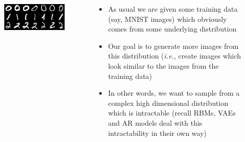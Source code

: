 \begin{frame}

	\begin{columns}

		\begin{center}
			\begin{figure}
				\includegraphics[scale=0.3]{images/mnist_ground.png}
			\end{figure}
		\end{center}
		
		\begin{overlayarea}{\textwidth}{\textheight}
			\begin{itemize}[<+->]
			\item As usual we are given some training data (say, MNIST images) which obviously comes from some underlying distribution
			\item Our goal is to generate more images from this distribution (\textit{i.e.}, create images which look similar to the images from the training data)
			\item In other words, we want to sample from a complex high dimensional distribution which is intractable (recall RBMs, VAEs and AR models deal with this intractability in their own way)

			\end{itemize}
		\end{overlayarea}
	\end{columns}
\end{frame}

